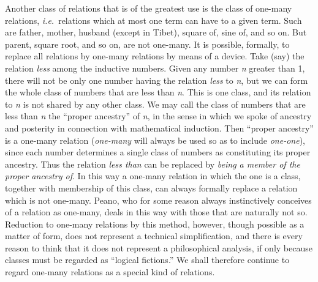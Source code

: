 {Another class of relations that is of the greatest use
is
the
class of
one-many relations, \textit{i.e.}\ 
relations which at most one term can have to a
given term. Such are father, mother, husband (except in Tibet), square
of, sine of, and so on. But parent, square root, and so on, are not
one-many. It is possible, formally, to replace all relations by
one-many relations by means of a device. Take (say) the relation \textit{less}
among the inductive numbers. Given any number \textit{n }greater than 1,
there
will not be only one number having the relation \textit{less} to \textit{n}, but we can
form the whole class of numbers that are less than \textit{n}. This is one
class, and its relation to \textit{n}
is not shared by any other class. We may call the class of numbers that
are less than \textit{n}
the
``proper
ancestry'' of \textit{n},
in the sense in which we spoke of ancestry and
posterity in connection with mathematical induction. Then ``proper
ancestry'' is a one-many relation (\textit{one-many}
will always be used so as to
include \textit{one-one}),
since each number determines a single class of
numbers as constituting its proper ancestry. Thus the relation \textit{less than} can be
replaced by \textit{being a
member
of the
proper ancestry of}. In this way a one-many relation in
which the one is
a class, together with membership of this class, can always formally
replace a relation which is not one-many. Peano, who for some reason
always instinctively conceives of a relation as one-many, deals in this
way with those that are naturally not so. Reduction to one-many
relations by this method, however, though possible as a matter of form,
does not represent a technical simplification, and there is every
reason to think that it does not represent a philosophical analysis, if
only because classes must be regarded as ``logical fictions.'' We shall
therefore continue to regard one-many relations as a special kind of
relations.\aftonly{\enlargethispage{\baselineskip}}

}
